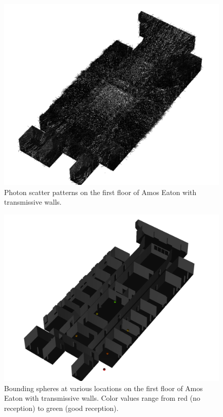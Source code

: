 \documentclass[%
        final,
        notitlepage,
        narroweqnarray,
        inline,
        twoside,
        ]{ieee}
\begin{document}
\begin{figure}
\begin{center}
\includegraphics[width=120mm]{trans_photons.png}
\caption{Photon scatter patterns on the first floor of Amos Eaton with
transmissive walls.}
\label{trans_photons}
\end{center}
\end{figure}

\begin{figure}
\begin{center}
\includegraphics[width=120mm]{trans_sphere.png}
\caption{Bounding spheres at various locations on the first floor of Amos Eaton
with transmissive walls.  Color values range from red (no reception) to green
(good reception).}
\label{trans_sphere}
\end{center}
\end{figure}
\end{document}
